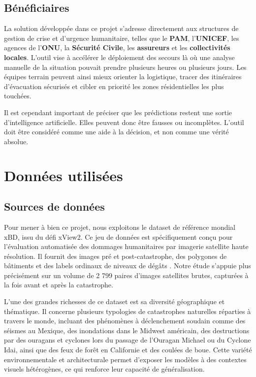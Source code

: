 \documentclass[french,12pt]{article}
\begin{document}
\subsection{Bénéficiaires}

La solution développée dans ce projet s'adresse directement aux structures de gestion de crise et d'urgence humanitaire, telles que le \textbf{PAM}, l'\textbf{UNICEF}, les agences de l'\textbf{ONU}, la \textbf{Sécurité Civile}, les \textbf{assureurs} et les \textbf{collectivités locales}. L'outil vise à accélérer le déploiement des secours là où une analyse manuelle de la situation pouvait prendre plusieurs heures ou plusieurs jours. Les équipes terrain peuvent ainsi mieux orienter la logistique, tracer des itinéraires d'évacuation sécurisés et cibler en priorité les zones résidentielles les plus touchées.

Il est cependant important de préciser que les prédictions restent une sortie d'intelligence artificielle. Elles peuvent donc être fausses ou incomplètes. L'outil doit être considéré comme une aide à la décision, et non comme une vérité absolue.

\section{Données utilisées}

\subsection{Sources de données}

Pour mener à bien ce projet, nous exploitons le dataset de référence mondial xBD, issu du défi xView2. Ce jeu de données est spécifiquement conçu pour l'évaluation automatisée des dommages humanitaires par imagerie satellite haute résolution. Il fournit des images pré et post-catastrophe, des polygones de bâtiments et des labels ordinaux de niveaux de dégâts \cite{xbd}. Notre étude s'appuie plus précisément sur un volume de 2 799 paires d'images satellites brutes, capturées à la fois avant et après la catastrophe.

L'une des grandes richesses de ce dataset est sa diversité géographique et thématique. Il concerne plusieurs typologies de catastrophes naturelles réparties à travers le monde, incluant des phénomènes à déclenchement soudain comme des séismes au Mexique, des inondations dans le Midwest américain, des destructions par des ouragans et cyclones lors du passage de l'Ouragan Michael ou du Cyclone Idai, ainsi que des feux de forêt en Californie et des coulées de boue. Cette variété environnementale et architecturale permet d'exposer les modèles à des contextes visuels hétérogènes, ce qui renforce leur capacité de généralisation.
\end{document}
